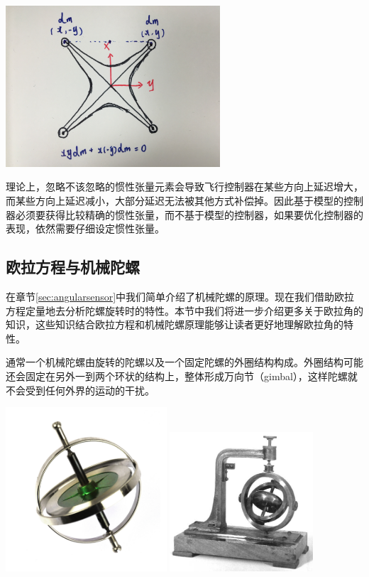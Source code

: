 \documentclass[11pt]{article}
\begin{document}
\begin{center}
\includegraphics[width=0.6\textwidth]{images/IMG_2301.jpg}
\end{center}

理论上，忽略不该忽略的惯性张量元素会导致飞行控制器在某些方向上延迟增大，而某些方向上延迟减小，大部分延迟无法被其他方式补偿掉。因此基于模型的控制器必须要获得比较精确的惯性张量，而不基于模型的控制器，如果要优化控制器的表现，依然需要仔细设定惯性张量。

\subsection{欧拉方程与机械陀螺}\label{sec:eulereqngyro}
在章节\ref{sec:angularsensor}中我们简单介绍了机械陀螺的原理。现在我们借助欧拉方程定量地去分析陀螺旋转时的特性。本节中我们将进一步介绍更多关于欧拉角的知识，这些知识结合欧拉方程和机械陀螺原理能够让读者更好地理解欧拉角的特性。

通常一个机械陀螺由旋转的陀螺以及一个固定陀螺的外圈结构构成。外圈结构可能还会固定在另外一到两个环状的结构上，整体形成万向节（gimbal），这样陀螺就不会受到任何外界的运动的干扰。

\includegraphics[width=0.45\textwidth]{images/gyro.jpg}
\includegraphics[width=0.4\textwidth]{images/gimbalgyro.jpg}
\end{document}

